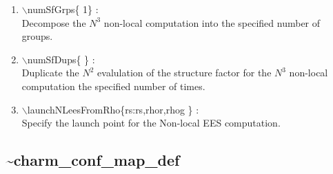 \documentclass[12pt]{article}
\begin{document}
\begin{enumerate}
  \vspace{0.15in} 
  \item $\backslash$numSfGrps\{ 1\} : \\    
  Decompose the $N^3$ non-local computation into the specified number of groups.
  \vspace{0.15in} 
  \item $\backslash$numSfDups\{ \} : \\    
  Duplicate the $N^2$ evalulation of the structure factor for the
  $N^3$ non-local computation the specified number of times.
  \vspace{0.15in} 
  \item $\backslash$launchNLeesFromRho\{rs:rs,rhor,rhog \} : \\  
  Specify the launch point for the Non-local EES computation.
\end{enumerate}

\newpage
\subsection*{\bf \~{ }charm\_conf\_map\_def}
\end{document}
